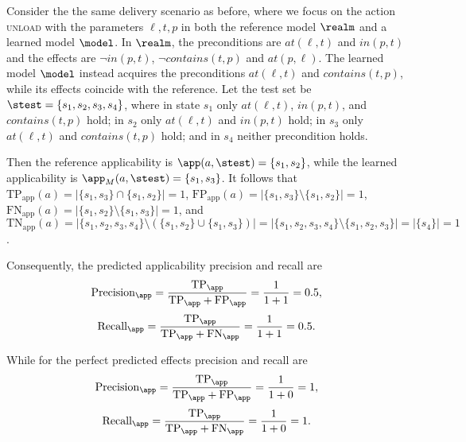 \documentclass{article}
\begin{document}
Consider the the same delivery scenario as before, where we focus on the action \textsc{unload} with the parameters $\ell,t,p$ in both the reference model $\realm$ and a learned model $\model$. In $\realm$, the preconditions are $\mathit{at}(\ell,t)$ and $\mathit{in}(p,t)$ and the effects are $\neg\mathit{in}(p,t)$, $\neg\mathit{contains}(t,p)$ and $\mathit{at}(p,\ell)$. The learned model $\model$ instead acquires the preconditions $\mathit{at}(\ell,t)$ and $\mathit{contains}(t,p)$, while its effects coincide with the reference. Let the test set be $\stest=\{s_1,s_2,s_3,s_4\}$, where in state $s_1$ only $\mathit{at}(\ell,t)$, $\mathit{in}(p,t)$, and $\mathit{contains}(t,p)$ hold; in $s_2$ only $\mathit{at}(\ell,t)$ and $\mathit{in}(p,t)$ hold; in $s_3$ only $\mathit{at}(\ell,t)$ and $\mathit{contains}(t,p)$ hold; and in $s_4$ neither precondition holds. 

Then the reference applicability is $\app(a,\stest)=\{s_1,s_2\}$, while the learned applicability is $\app_M(a,\stest)=\{s_1,s_3\}$. It follows that $\mathrm{TP}_{\text{app}}(a) =|\{s_1,s_3\}\cap\{s_1,s_2\}|=1$, $\mathrm{FP}_{\text{app}}(a) =|\{s_1,s_3\}\setminus\{s_1,s_2\}|=1$, $\mathrm{FN}_{\text{app}}(a) =|\{s_1,s_2\}\setminus\{s_1,s_3\}|=1$, and $ \text{TN}_{\text{app}}(a) = \left| \{s_1, s_2, s_3, s_4\} \setminus \left( \{s_1, s_2\} \cup \{s_1, s_3\} \right) \right| = \left| \{s_1, s_2, s_3, s_4\} \setminus \{s_1, s_2, s_3\} \right| = |\{s_4\}| = 1 $. 

Consequently, the predicted applicability precision and recall are 
\[
\mathrm{Precision}_{\app}
=\frac{\mathrm{TP}_{\app}}{\mathrm{TP}_{\app}+\mathrm{FP}_{\app}}
=\frac{1}{1+1}=0.5,
\]
\[
\mathrm{Recall}_{\app}
=\frac{\mathrm{TP}_{\app}}{\mathrm{TP}_{\app}+\mathrm{FN}_{\app}}
=\frac{1}{1+1}=0.5.
\]

While for the perfect predicted effects precision and recall are
\[
\mathrm{Precision}_{\app}
=\frac{\mathrm{TP}_{\app}}{\mathrm{TP}_{\app}+\mathrm{FP}_{\app}}
=\frac{1}{1+0}=1,
\]
\[
\mathrm{Recall}_{\app}
=\frac{\mathrm{TP}_{\app}}{\mathrm{TP}_{\app}+\mathrm{FN}_{\app}}
=\frac{1}{1+0}=1.
\]
\end{document}
